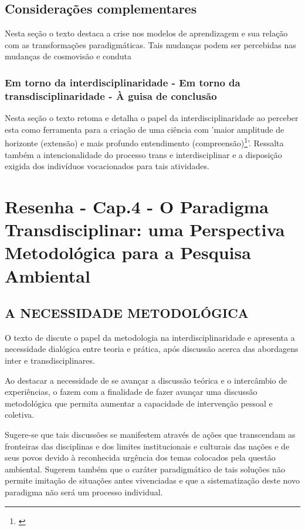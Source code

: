 \documentclass[
   article,       %
   12pt,          %
   oneside,       %
   a4paper,       %
   english,       %
   brazil,           %
   sumario=tradicional
   ]{abntex2}
\begin{document}
\subsection{Considerações complementares}

Nesta seção o texto destaca a crise nos modelos de aprendizagem e sua relação com as transformações paradigmáticas. Tais mudanças podem ser percebidas nas mudanças de cosmovisão e conduta

\subsubsection{Em torno da interdisciplinaridade - Em torno da transdisciplinaridade - À guisa de conclusão}

Nesta seção o texto retoma e detalha o papel da interdisciplinaridade ao perceber esta como ferramenta para a criação de uma ciência com 'maior amplitude de horizonte (extensão) e mais profundo entendimento (compreensão)\footnote{\cite[p.66]{consideracoes_Interdisciplinaridade}}'.  Ressalta também a intencionalidade do processo trans e interdisciplinar e a disposição exigida dos indivíduos vocacionados para tais atividades.

\newpage

\section{Resenha - Cap.4 - O Paradigma Transdisciplinar:
uma Perspectiva Metodológica para a Pesquisa Ambiental}

\subsection{A NECESSIDADE METODOLÓGICA}


O texto de \cite{Paradigma_Transdisciplinar_Metodologica} discute o papel da metodologia na interdisciplinaridade e apresenta a necessidade dialógica entre teoria e prática, após discussão acerca das abordagens inter e transdisciplinares.

Ao destacar a necessidade de se avançar a discussão teórica e o intercâmbio de experiências, o fazem com a finalidade de fazer avançar uma discussão metodológica que permita aumentar a capacidade de intervenção pessoal e coletiva.

Sugere-se que tais discussões se manifestem através de ações que transcendam as fronteiras das disciplinas e dos limites institucionais e culturais das nações e de seus povos devido à reconhecida urgência dos temas colocados pela questão ambiental. Sugerem também que o caráter paradigmático de tais soluções não permite imitação de situações antes vivenciadas e que a sistematização deste novo paradigma não será um processo individual.
\end{document}
